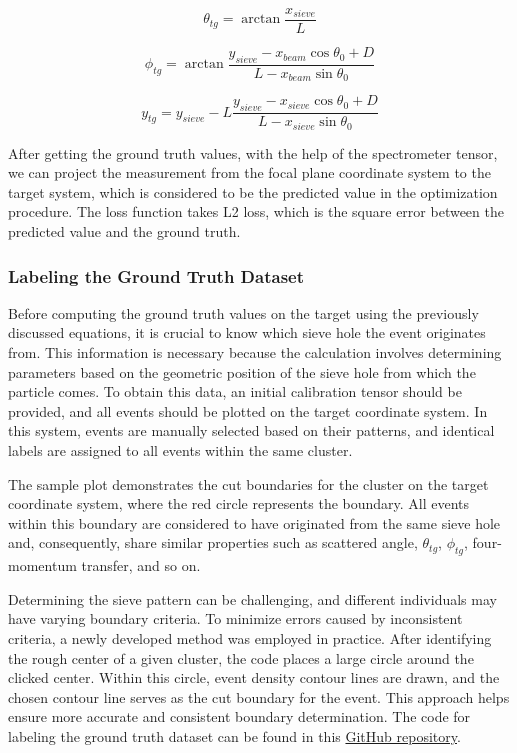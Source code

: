 \begin{equation}
    \theta_{tg} = \arctan{\frac{x_{sieve}}{L}}
\end{equation}

\begin{equation}
    \phi_{tg} = \arctan{\frac{y_{sieve} - x_{beam}\cos{\theta_0} + D}{L - x_{beam}\sin{\theta_0}}}
\end{equation}

\begin{equation}
    y_{tg} = y_{sieve} - L \frac{y_{sieve}-x_{sieve}\cos{\theta_0} + D}{L - x_{sieve}\sin{\theta_0}}
\end{equation}

After getting the ground truth values, with the help of the spectrometer tensor, we can project the measurement from the focal plane coordinate system to the target system, which is considered to be the predicted value in the optimization procedure. The loss function takes L2 loss, which is the square error between the predicted value and the ground truth. 


\subsubsection{Labeling the Ground Truth Dataset}

Before computing the ground truth values on the target using the previously discussed equations, it is crucial to know which sieve hole the event originates from. This information is necessary because the calculation involves determining parameters based on the geometric position of the sieve hole from which the particle comes. To obtain this data, an initial calibration tensor should be provided, and all events should be plotted on the target coordinate system. In this system, events are manually selected based on their patterns, and identical labels are assigned to all events within the same cluster.

The sample plot demonstrates the cut boundaries for the cluster on the target coordinate system, where the red circle represents the boundary. All events within this boundary are considered to have originated from the same sieve hole and, consequently, share similar properties such as scattered angle, $\theta_{tg}$, $\phi_{tg}$, four-momentum transfer, and so on.

Determining the sieve pattern can be challenging, and different individuals may have varying boundary criteria. To minimize errors caused by inconsistent criteria, a newly developed method was employed in practice. After identifying the rough center of a given cluster, the code places a large circle around the clicked center. Within this circle, event density contour lines are drawn, and the chosen contour line serves as the cut boundary for the event. This approach helps ensure more accurate and consistent boundary determination. The code for labeling the ground truth dataset can be found in this \href{https://github.com/Jiansiyu/GeneralScripts/blob/master/OptCut/CRexCut/cutPro.C}{GitHub repository}.


